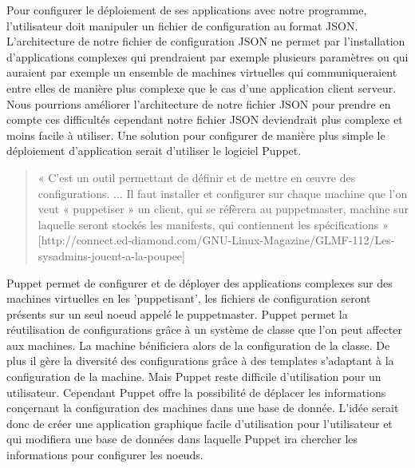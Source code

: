 \documentclass{report}
\begin{document}
    Pour configurer le déploiement de ses applications avec notre programme, l'utilisateur doit manipuler un fichier de configuration au format JSON.
    L'architecture de notre fichier de configuration JSON ne permet par l'installation d'applications complexes qui prendraient par exemple plusieurs paramètres ou qui auraient par exemple un ensemble de machines virtuelles qui communiqueraient entre elles de manière plus complexe que le cas d'une application client serveur.
    Nous pourrions améliorer l'architecture de notre fichier JSON pour prendre en compte ces difficultés cependant notre fichier JSON deviendrait plus complexe et moins facile à utiliser.
    Une solution pour configurer de manière plus simple le déploiement d'application serait d'utiliser le logiciel Puppet.
    \begin{quote}
        « C'est un outil permettant de définir et de mettre en œuvre des configurations.
        ...
       Il faut installer et configurer sur chaque machine que l'on veut « puppetiser » un client, qui se réfèrera au puppetmaster, machine sur laquelle seront stockés les manifests, qui contiennent les spécifications »
        [http://connect.ed-diamond.com/GNU-Linux-Magazine/GLMF-112/Les-sysadmins-jouent-a-la-poupee]
    \end{quote}
    Puppet permet de configurer et de déployer des applications complexes sur des machines virtuelles en les 'puppetisant', les fichiers de configuration seront présents sur un seul noeud appelé le puppetmaster.
    Puppet permet la réutilisation de configurations grâce à un système de classe que l'on peut affecter aux machines. La machine bénificiera alors de la configuration de la classe. De plus il gère la diversité des configurations grâce à des templates s'adaptant à la configuration de la machine.
    Mais Puppet reste difficile d'utilisation pour un utilisateur.
    Cependant Puppet offre la possibilité de déplacer
    les informations conçernant la configuration des machines dans une base de donnée.
    L'idée serait donc de créer une application graphique facile d'utilisation pour l'utilisateur et qui modifiera une base de données dans laquelle Puppet ira chercher les informations pour configurer les noeuds.



\end{document}

